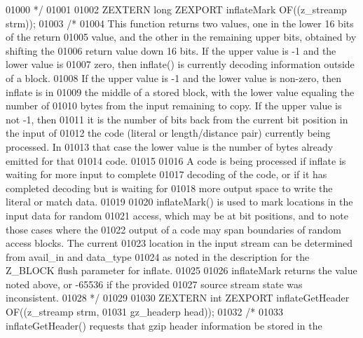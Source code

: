 \begin{DoxyCode}
01000 \textcolor{comment}{*/}
01001 
01002 ZEXTERN \textcolor{keywordtype}{long} ZEXPORT inflateMark OF((z\_streamp strm));
01003 \textcolor{comment}{/*}
01004 \textcolor{comment}{     This function returns two values, one in the lower 16 bits of the return}
01005 \textcolor{comment}{   value, and the other in the remaining upper bits, obtained by shifting the}
01006 \textcolor{comment}{   return value down 16 bits.  If the upper value is -1 and the lower value is}
01007 \textcolor{comment}{   zero, then inflate() is currently decoding information outside of a block.}
01008 \textcolor{comment}{   If the upper value is -1 and the lower value is non-zero, then inflate is in}
01009 \textcolor{comment}{   the middle of a stored block, with the lower value equaling the number of}
01010 \textcolor{comment}{   bytes from the input remaining to copy.  If the upper value is not -1, then}
01011 \textcolor{comment}{   it is the number of bits back from the current bit position in the input of}
01012 \textcolor{comment}{   the code (literal or length/distance pair) currently being processed.  In}
01013 \textcolor{comment}{   that case the lower value is the number of bytes already emitted for that}
01014 \textcolor{comment}{   code.}
01015 \textcolor{comment}{}
01016 \textcolor{comment}{     A code is being processed if inflate is waiting for more input to complete}
01017 \textcolor{comment}{   decoding of the code, or if it has completed decoding but is waiting for}
01018 \textcolor{comment}{   more output space to write the literal or match data.}
01019 \textcolor{comment}{}
01020 \textcolor{comment}{     inflateMark() is used to mark locations in the input data for random}
01021 \textcolor{comment}{   access, which may be at bit positions, and to note those cases where the}
01022 \textcolor{comment}{   output of a code may span boundaries of random access blocks.  The current}
01023 \textcolor{comment}{   location in the input stream can be determined from avail\_in and data\_type}
01024 \textcolor{comment}{   as noted in the description for the Z\_BLOCK flush parameter for inflate.}
01025 \textcolor{comment}{}
01026 \textcolor{comment}{     inflateMark returns the value noted above, or -65536 if the provided}
01027 \textcolor{comment}{   source stream state was inconsistent.}
01028 \textcolor{comment}{*/}
01029 
01030 ZEXTERN \textcolor{keywordtype}{int} ZEXPORT inflateGetHeader OF((z\_streamp strm,
01031                                          gz\_headerp head));
01032 \textcolor{comment}{/*}
01033 \textcolor{comment}{     inflateGetHeader() requests that gzip header information be stored in the}

\end{DoxyCode}
